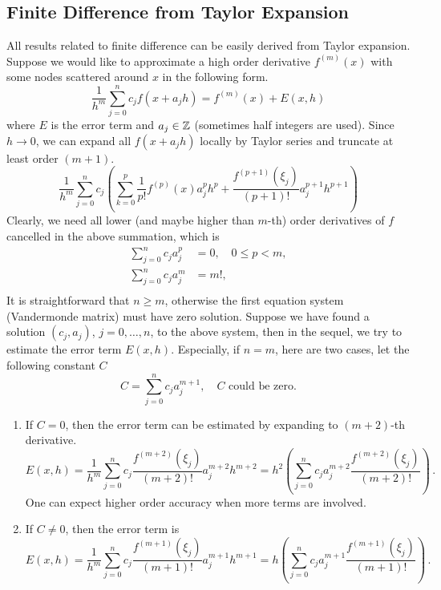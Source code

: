 \subsection{Finite Difference from Taylor Expansion}
All results related to finite difference can be easily derived from Taylor expansion. Suppose we would like to approximate a high order derivative $f^{(m)}(x)$ with some nodes scattered around $x$ in the following form. 
\begin{equation}
    \frac{1}{h^m} \sum_{j = 0}^n c_j f(x + a_j h) = f^{(m)}(x) + E(x, h)
\end{equation}
where $E$ is the error term and $a_j\in\mathbb Z$ (sometimes half integers are used). Since $h\to 0$, we can expand all $f(x + a_j h)$ locally by Taylor series and truncate at least order $(m+1)$.
\begin{equation}
    \frac{1}{h^m} \sum_{j=0}^n c_j \left( \sum_{k=0}^{p} \frac{1}{p!}f^{(p)}(x) a_j^p h^p + \frac{f^{(p+1)}(\xi_j)}{(p+1)!} a_j^{p+1} h^{p+1}\right)
\end{equation} 
Clearly, we need all lower (and maybe higher than $m$-th) order derivatives of $f$ cancelled in the above summation, which is 
\begin{equation}
    \begin{aligned}
        \sum_{j=0}^n c_j a_j^p &= 0,\quad 0\le p < m,    \\
        \sum_{j=0}^n c_j a_j^m &= {m!}, \\
    \end{aligned}
\end{equation}
It is straightforward that $n \ge m$, otherwise the first equation system (Vandermonde matrix) must have zero solution.  Suppose we have found a solution $(c_j, a_j)$, $j=0,\dots, n$,  to the above system, then in the sequel, we try to estimate the error term $E(x, h)$. Especially, if $n = m$, here are two cases, let the following constant $C$ 
$$       C =  \sum_{j=0}^n c_j a_j^{m+1}, \quad \text{$C$ could be zero}. $$
\begin{enumerate}
    \item If $C = 0$, then the error term can be estimated by expanding to $(m+2)$-th derivative. 
    \begin{equation}\label{EQ: ERROR FD}
        E(x, h) = \frac{1}{h^m}\sum_{j=0}^n c_j \frac{f^{(m+2)}(\xi_j)}{(m+2)!} a_j^{m+2} h^{m+2} = h^2 \left(\sum_{j=0}^n c_j  a_j^{m+2}\frac{f^{(m+2)}(\xi_j)}{(m+2)!}\right)\,.
    \end{equation}
    One can expect higher order accuracy when more terms are involved. 
    \item If $C\neq 0$, then the error term is 
    \begin{equation}\label{EQ: ERROR FD NZERO}
        E(x, h) = \frac{1}{h^m}\sum_{j=0}^n c_j \frac{f^{(m+1)}(\xi_j)}{(m+1)!} a_j^{m+1} h^{m+1} = h \left(\sum_{j=0}^n c_j  a_j^{m+1}\frac{f^{(m+1)}(\xi_j)}{(m+1)!}\right)\,.
    \end{equation}
\end{enumerate}
